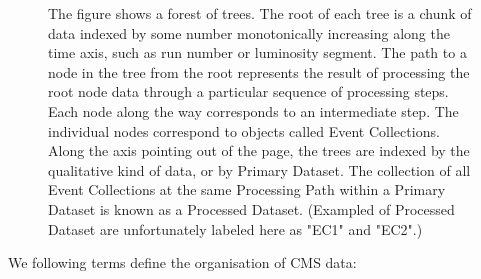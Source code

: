 \documentclass{cmspaper}
\begin{document}
\begin{figure}[hbtp]
  \begin{center}
    \caption{The figure shows a forest of trees.  The root of each tree is a 
chunk of data indexed by some number monotonically increasing along the time axis, 
such as run number or luminosity segment.
The path to a node in the tree from the root represents the result of processing 
the root node data through a particular sequence of processing steps.  Each node 
along the way corresponds to an intermediate step.  The individual nodes correspond to objects 
called Event Collections.  Along the axis pointing out of the page, the trees are 
indexed by the qualitative kind of data, or by Primary Dataset. The collection of all 
Event Collections at the same Processing Path within a Primary Dataset is known as a
Processed Dataset. (Exampled of Processed Dataset are unfortunately labeled here 
as "EC1" and "EC2".)}
    \label{fig:forest}
  \end{center}
\end{figure}

We following terms define the organisation of CMS data:
\end{document}
